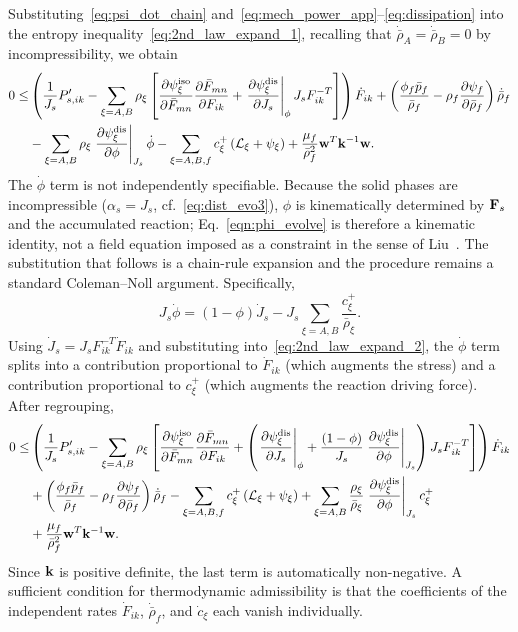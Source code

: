 \documentclass[11pt]{article}
\begin{document}
Substituting~\eqref{eq:psi_dot_chain} and~\eqref{eq:mech_power_app}--\eqref{eq:dissipation} into the entropy inequality~\eqref{eq:2nd_law_expand_1}, recalling that $\dot{\bar\rho}_A = \dot{\bar\rho}_B = 0$ by incompressibility, we obtain
%
\begin{align}
  0 \leq & \left(\frac{1}{J_s} P'_{s,ik} - \sum_{\xi=A,B} \rho_\xi \left[\frac{\partial \psi^{\text{iso}}_\xi}{\partial \bar{F}_{mn}} \frac{\partial \bar{F}_{mn}}{\partial F_{ik}} + \left.\frac{\partial \psi^\text{dis}_\xi}{\partial J_s}\right\vert_\phi J_s F^{-T}_{ik}\right]\right) \dot{F}_{ik} + \left(\frac{\phi_f \bar{p}_f}{\bar\rho_f} - \rho_f \frac{\partial \psi_f}{\partial \bar\rho_f}\right) \dot{\bar\rho}_f \notag \\
  & - \sum_{\xi=A,B} \rho_\xi \left.\frac{\partial \psi^\text{dis}_\xi}{\partial \phi}\right\vert_{J_s}\dot\phi - \sum_{\xi=A,B,f} c^{+}_\xi \left(\mathcal{L}_\xi + \psi_\xi\right) + \frac{\mu_f}{\bar\rho_f^2} \mathbf{w}^T \mathbf{k}^{-1} \mathbf{w}.
  \label{eq:2nd_law_expand_2}
\end{align}
%
The $\dot\phi$ term is not independently specifiable.  Because the solid phases are incompressible ($\alpha_s = J_s$, cf.~\eqref{eq:dist_evo3}), $\phi$ is kinematically determined by $\mathbf{F}_s$ and the accumulated reaction; Eq.~\eqref{eqn:phi_evolve} is therefore a kinematic identity, not a field equation imposed as a constraint in the sense of Liu~\cite{liu1972method}.  The substitution that follows is a chain-rule expansion and the procedure remains a standard Coleman--Noll argument.  Specifically,
\begin{equation}
  J_s \dot\phi = (1-\phi)\dot{J}_s - J_s\sum_{\xi=A,B}\frac{c^+_\xi}{\bar\rho_\xi}.
  \label{eq:phi_dot_sub}
\end{equation}
Using $\dot{J}_s = J_s F^{-T}_{ik}\dot{F}_{ik}$ and substituting into~\eqref{eq:2nd_law_expand_2}, the $\dot\phi$ term splits into a contribution proportional to $\dot{F}_{ik}$ (which augments the stress) and a contribution proportional to $c^+_\xi$ (which augments the reaction driving force).  After regrouping,
%
\begin{align}
  0 \leq & \left(\frac{1}{J_s} P'_{s,ik} - \sum_{\xi=A,B} \rho_\xi \left[\frac{\partial \psi^{\text{iso}}_\xi}{\partial \bar{F}_{mn}} \frac{\partial \bar{F}_{mn}}{\partial F_{ik}} + \left(\left.\frac{\partial \psi^\text{dis}_\xi}{\partial J_s}\right\vert_\phi + \frac{(1-\phi)}{J_s}\left.\frac{\partial \psi^\text{dis}_\xi}{\partial \phi}\right\vert_{J_s}\right) J_s F^{-T}_{ik}\right]\right) \dot{F}_{ik} \notag \\
  & + \left(\frac{\phi_f \bar{p}_f}{\bar\rho_f} - \rho_f \frac{\partial \psi_f}{\partial \bar\rho_f}\right) \dot{\bar\rho}_f
  - \sum_{\xi=A,B,f} c^{+}_\xi \left(\mathcal{L}_\xi + \psi_\xi\right) + \sum_{\xi=A,B}\frac{\rho_\xi}{\bar\rho_\xi} \left.\frac{\partial \psi^\text{dis}_\xi}{\partial \phi}\right\vert_{J_s} c^+_\xi \notag \\
  & + \frac{\mu_f}{\bar\rho_f^2} \mathbf{w}^T \mathbf{k}^{-1} \mathbf{w}. \notag
\end{align}
%
Since $\mathbf{k}$ is positive definite, the last term is automatically non-negative.  A sufficient condition for thermodynamic admissibility is that the coefficients of the independent rates $\dot{F}_{ik}$, $\dot{\bar\rho}_f$, and $\dot{c}_\xi$ each vanish individually.
\end{document}
